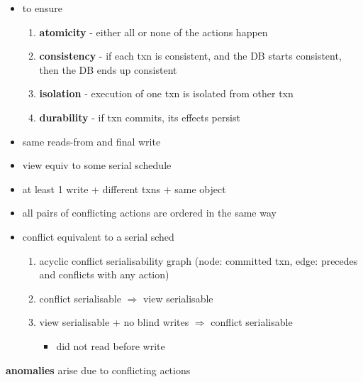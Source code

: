 \documentclass[10pt, landscape]{article}
\begin{document}
\begin{multicols*}{4}
  \begin{itemize}
    \item to ensure  
      \begin{enumerate}
        \item \textbf{atomicity} - either all or none of the actions happen
        \item \textbf{consistency} - if each txn is consistent, and the DB starts consistent, then the DB ends up consistent
        \item \textbf{isolation} - execution of one txn is isolated from other txn
        \item \textbf{durability} - if txn commits, its effects persist
      \end{enumerate}
  \end{itemize}

  \begin{itemize}
    \item {} same reads-from and final write
    \item {} view equiv to some serial schedule
    \item {} at least 1 write + different txns + same object
    \item {} all pairs of conflicting actions are ordered in the same way
  \end{itemize}

  \begin{itemize}
    \item {} conflict equivalent to a serial sched
      \begin{enumerate}
        \item acyclic conflict serialisability graph (node: committed txn, edge: precedes and conflicts with any action)
        \item conflict serialisable $\Rightarrow$ view serialisable
        \item view serialisable + no blind writes $\Rightarrow$ conflict serialisable
          \begin{itemize}
            \item {} did not read before write
          \end{itemize}
      \end{enumerate}
  \end{itemize}

  \textbf{anomalies} arise due to conflicting actions


\end{multicols*}
\end{document}
